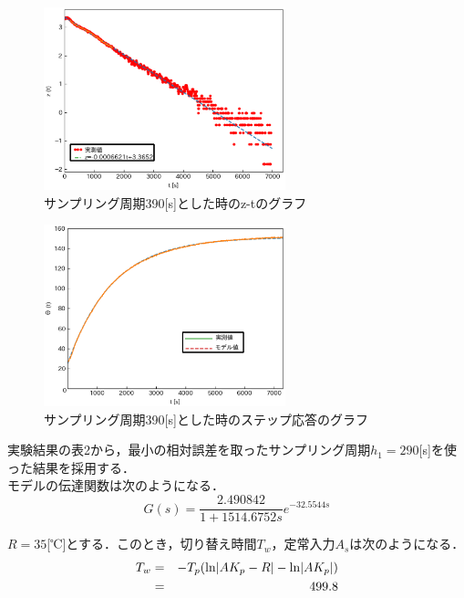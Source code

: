 \documentclass[12pt]{jsarticle}
\begin{document}
\begin{figure}[H]
  \begin{center}
    \includegraphics[clip,width=7.0cm]{../graph/z-t390s.eps}
    \caption{サンプリング周期390[s]とした時のz-tのグラフ}
    \label{z-t_h1=390s}
  \end{center}
\end{figure}
\begin{figure}[H]
  \begin{center}
    \includegraphics[clip,width=7.0cm]{../graph/step_response390s.eps}
    \caption{サンプリング周期390[s]とした時のステップ応答のグラフ}
    \label{step_response390s}
  \end{center}
\end{figure}
実験結果の表2から，最小の相対誤差を取ったサンプリング周期$h_1=290$[s]を使った結果を採用する．\\
モデルの伝達関数は次のようになる．
\begin{equation}
  \label{transform_result}
  G(s) = \frac{2.490842}{1+1514.6752s}e^{-32.5544s}
\end{equation}

\newpage
\setcounter{page}{20}
$R=35$[℃]とする．このとき，切り替え時間$T_w$，定常入力$A_s$は次のようになる．
\begin{eqnarray}
  \label{T_w}
  T_w &=& -T_p ({\rm ln}|A K_p - R| - {\rm ln}| A K_p|) \\
      &=& 499.8
\end{eqnarray}
\end{document}

